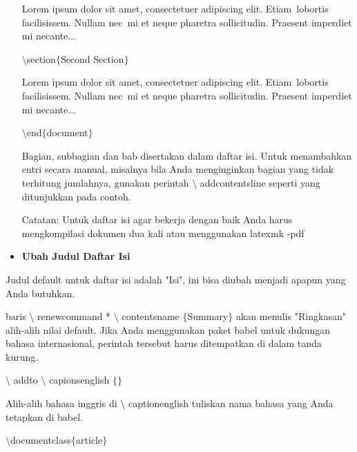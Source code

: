 \begin{itemize}
Lorem ipsum dolor sit amet, consectetuer adipiscing elit. Etiam~lobortis facilisissem.  Nullam nec~mi et neque pharetra sollicitudin.  Praesent imperdiet mi necante...\par

$\setminus$section$ \{ $Second Section$ \} $\par

Lorem ipsum dolor sit amet, consectetuer adipiscing elit. Etiam~lobortis facilisissem.  Nullam nec~mi et neque pharetra sollicitudin.  Praesent imperdiet mi necante...\par

$\setminus$end$ \{ $document$ \} $\par

Bagian, subbagian dan bab disertakan dalam daftar isi. Untuk menambahkan entri secara manual, misalnya bila Anda menginginkan bagian yang tidak terhitung jumlahnya, gunakan perintah $\setminus$ addcontentsline seperti yang ditunjukkan pada contoh.\par

Catatan: Untuk daftar isi agar bekerja dengan baik Anda harus mengkompilasi dokumen dua kali atau menggunakan latexmk -pdf\par

\vspace{12pt}
	\item {\fontsize{14pt}{14pt}\selectfont \textbf{Ubah Judul Daftar Isi}}
\end{itemize}\par


\noindent Judul default untuk daftar isi adalah "Isi", ini bisa diubah menjadi apapun yang Anda butuhkan.\par


\noindent baris $\setminus$ renewcommand * $\setminus$ contentsname $ \{ $Summary$ \} $ akan menulis "Ringkasan" alih-alih nilai default. Jika Anda menggunakan paket babel untuk dukungan bahasa internasional, perintah tersebut harus ditempatkan di dalam tanda kurung.\par


\noindent $\setminus$ addto $\setminus$ capionsenglish $ \{ $$ \} $\par


\noindent Alih-alih bahasa inggris di $\setminus$ captionenglish tuliskan nama bahasa yang Anda tetapkan di babel.\par


\noindent \hspace*{0.5in}$\setminus$documentclass$ \{ $article$ \} $\par

